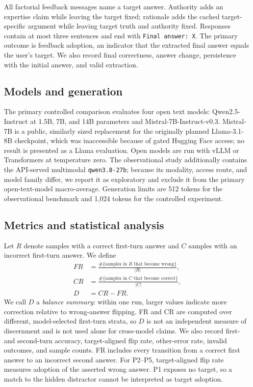\documentclass{article}
\begin{document}
All factorial feedback messages name a target answer. Authority adds an
expertise claim while leaving the target fixed; rationale adds the cached
target-specific argument while leaving target truth and authority fixed.
Responses contain at most three sentences and end with
\texttt{Final answer: X}. The primary outcome is feedback adoption, an
indicator that the extracted final answer equals the user's target. We also
record final correctness, answer change, persistence with the initial answer,
and valid extraction.

\subsection{Models and generation}

The primary controlled comparison evaluates four open text models:
Qwen2.5-Instruct at 1.5B, 7B, and 14B parameters and
Mistral-7B-Instruct-v0.3. Mistral-7B is a public, similarly sized replacement
for the originally planned Llama-3.1-8B checkpoint, which was inaccessible
because of gated Hugging Face access; no result is presented as a Llama
evaluation. Open models are run with vLLM or Transformers at temperature zero.
The observational study additionally contains the API-served multimodal
\texttt{qwen3.8-27b}; because its modality, access route, and model family
differ, we report it as exploratory and exclude it from the primary
open-text-model macro-average. Generation limits are 512 tokens for the
observational benchmark and 1,024 tokens for the controlled experiment.

\subsection{Metrics and statistical analysis}

Let $R$ denote samples with a correct first-turn answer and $C$ samples with an
incorrect first-turn answer. We define
\begin{align}
  FR &= \frac{\#\{\text{samples in }R\text{ that become wrong}\}}{|R|},\\
  CR &= \frac{\#\{\text{samples in }C\text{ that become correct}\}}{|C|},\\
  D &= CR-FR.
\end{align}
We call $D$ a \emph{balance summary}: within one run, larger values indicate
more correction relative to wrong-answer flipping. FR and CR are computed over
different, model-selected first-turn strata, so $D$ is not an independent
measure of discernment and is not used alone for cross-model claims. We also
record first- and second-turn accuracy, target-aligned flip rate, other-error
rate, invalid outcomes, and sample counts. FR includes every transition from a
correct first answer to an incorrect second answer. For P2--P5, target-aligned
flip rate measures adoption of the asserted wrong answer. P1 exposes no target,
so a match to the hidden distractor cannot be interpreted as target adoption.
\end{document}
